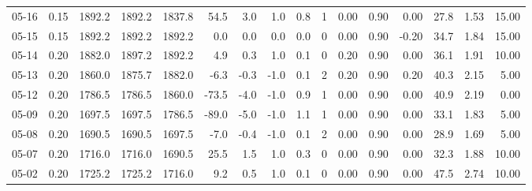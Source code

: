 \begin{threeparttable}
{\begin{tabular}{lrrrrrrrrrrrrrrr}
  05-16 &     0.15 & 1892.2 & 1892.2 & 1837.8 &       54.5 &            3.0 &                      1.0 &                 0.8 &              1 &       0.00 &      0.90 &           0.00 &             27.8 &            1.53 &                  15.00 \\
  05-15 &     0.15 & 1892.2 & 1892.2 & 1892.2 &        0.0 &            0.0 &                      0.0 &                 0.0 &              0 &       0.00 &      0.90 &          -0.20 &             34.7 &            1.84 &                  15.00 \\
  05-14 &     0.20 & 1882.0 & 1897.2 & 1892.2 &        4.9 &            0.3 &                      1.0 &                 0.1 &              0 &       0.20 &      0.90 &           0.00 &             36.1 &            1.91 &                  10.00 \\
  05-13 &     0.20 & 1860.0 & 1875.7 & 1882.0 &       -6.3 &           -0.3 &                     -1.0 &                 0.1 &              2 &       0.20 &      0.90 &           0.20 &             40.3 &            2.15 &                   5.00 \\
  05-12 &     0.20 & 1786.5 & 1786.5 & 1860.0 &      -73.5 &           -4.0 &                     -1.0 &                 0.9 &              1 &       0.00 &      0.90 &           0.00 &             40.9 &            2.19 &                   0.00 \\
  05-09 &     0.20 & 1697.5 & 1697.5 & 1786.5 &      -89.0 &           -5.0 &                     -1.0 &                 1.1 &              1 &       0.00 &      0.90 &           0.00 &             33.1 &            1.83 &                   5.00 \\
  05-08 &     0.20 & 1690.5 & 1690.5 & 1697.5 &       -7.0 &           -0.4 &                     -1.0 &                 0.1 &              2 &       0.00 &      0.90 &           0.00 &             28.9 &            1.69 &                   5.00 \\
  05-07 &     0.20 & 1716.0 & 1716.0 & 1690.5 &       25.5 &            1.5 &                      1.0 &                 0.3 &              0 &       0.00 &      0.90 &           0.00 &             32.3 &            1.88 &                  10.00 \\
  05-02 &     0.20 & 1725.2 & 1725.2 & 1716.0 &        9.2 &            0.5 &                      1.0 &                 0.1 &              0 &       0.00 &      0.90 &           0.00 &             47.5 &            2.74 &                  10.00 \\

\end{tabular}}
\end{threeparttable}

